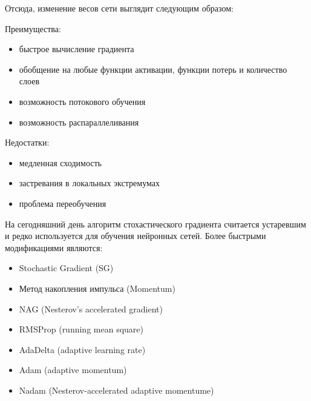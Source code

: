 \documentclass[11pt, oneside]{article}   	%
\begin{document}
	Отсюда, изменение весов сети выглядит следующим образом:
	
	\begin{figure}[h]
	\end{figure}
	
	
	Преимущества:
	\begin{itemize}
		\item быстрое вычисление градиента
		\item обобщение на любые функции активации, функции потерь и количество слоев
		\item возможность потокового обучения
		\item возможность распараллеливания
	\end{itemize}
	
	Недостатки: 
	\begin{itemize}
		\item медленная сходимость
		\item застревания в локальных экстремумах
		\item проблема переобучения
	\end{itemize}
	
	На сегодняшний день алгоритм стохастического градиента считается устаревшим и редко используется для обучения нейронных сетей. Более быстрыми модификациями являются:
	\begin{itemize}
		\item Stochastic Gradient (SG)
		\item Метод накопления импульса (Momentum)
		\item NAG (Nesterov's accelerated gradient)
		\item RMSProp (running mean square)
		\item AdaDelta (adaptive learning rate)
		\item Adam (adaptive momentum)
		\item Nadam (Nesterov-accelerated adaptive momentume)
	\end{itemize}
	
\end{document}
